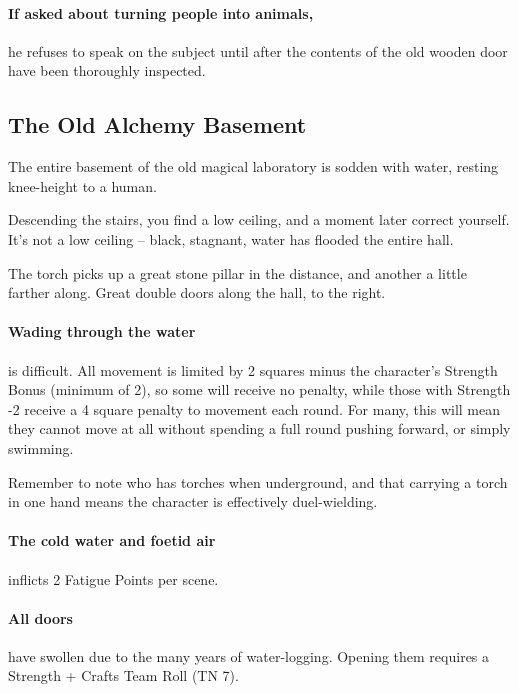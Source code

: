 \begin{multicols}{2}
\paragraph{If asked about turning people into animals,}
he refuses to speak on the subject until after the contents of the old wooden door have been thoroughly inspected.

\subsection{The Old Alchemy Basement}
\label{old_alchemy_basement}

The entire basement of the old magical laboratory is sodden with water, resting knee-height to a human.

\begin{boxtext}
  Descending the stairs, you find a low ceiling, and a moment later correct yourself.  It's not a low ceiling -- black, stagnant, water has flooded the entire hall.

  The torch picks up a great stone pillar in the distance, and another a little farther along.
  Great double doors along the hall, to the right.

\end{boxtext}

\paragraph{Wading through the water}
is difficult.
All movement is limited by 2 squares minus the character's Strength Bonus (minimum of 2), so some will receive no penalty, while those with Strength -2 receive a 4 square penalty to movement each round.
For many, this will mean they cannot move at all without spending a full round pushing forward, or simply swimming.

Remember to note who has torches when underground, and that carrying a torch in one hand means the character is effectively duel-wielding.

\paragraph{The cold water and foetid air}
inflicts 2 Fatigue Points per scene.

\paragraph{All doors}
have swollen due to the many years of water-logging.
Opening them requires a Strength + Crafts Team Roll (TN 7).


\end{multicols}
